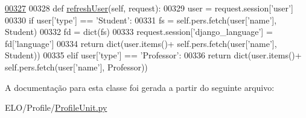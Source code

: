 \begin{DoxyCode}
\hypertarget{classProfile_1_1ProfileUnit_1_1BusProfile_l00327}{}\hyperlink{classProfile_1_1ProfileUnit_1_1BusProfile_a87c3d0374f709af7904656938eafd6d3}{00327} 
00328     \textcolor{keyword}{def }\hyperlink{classProfile_1_1ProfileUnit_1_1BusProfile_a87c3d0374f709af7904656938eafd6d3}{refreshUser}(self, request):
00329         user = request.session[\textcolor{stringliteral}{'user'}]
00330         \textcolor{keywordflow}{if} user[\textcolor{stringliteral}{'type'}] == \textcolor{stringliteral}{'Student'}:
00331             fs = self.pers.fetch(user[\textcolor{stringliteral}{'name'}], Student)
00332             fd = dict(fs)
00333             request.session[\textcolor{stringliteral}{'django\_language'}] = fd[\textcolor{stringliteral}{'language'}]
00334             \textcolor{keywordflow}{return} dict(user.items()+ self.pers.fetch(user[\textcolor{stringliteral}{'name'}], Student))
00335         \textcolor{keywordflow}{elif} user[\textcolor{stringliteral}{'type'}] == \textcolor{stringliteral}{'Professor'}:
00336             \textcolor{keywordflow}{return} dict(user.items()+ self.pers.fetch(user[\textcolor{stringliteral}{'name'}], Professor))

\end{DoxyCode}


A documentação para esta classe foi gerada a partir do seguinte arquivo\-:\begin{DoxyCompactItemize}
\item 
E\-L\-O/\-Profile/\hyperlink{ProfileUnit_8py}{Profile\-Unit.\-py}\end{DoxyCompactItemize}
